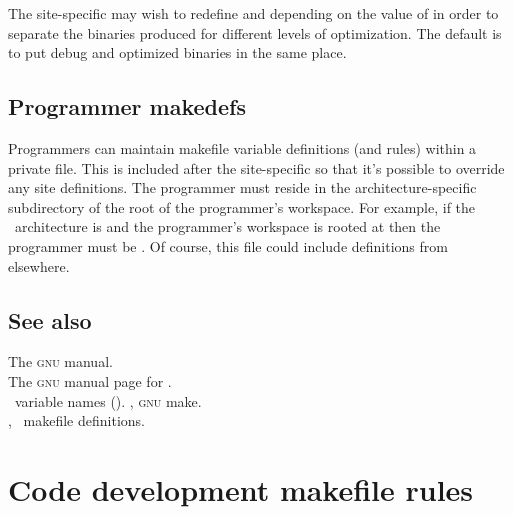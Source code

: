 The site-specific  may wish to redefine  and
 depending on the value of  in order to separate the
binaries produced for different levels of optimization.  The default is to put
debug and optimized binaries in the same place.

\subsection*{Programmer makedefs}

Programmers can maintain makefile variable definitions (and rules) within a
private  file.  This is included after the site-specific
 so that it's possible to override any site definitions.  The
programmer  must reside in the architecture-specific
subdirectory of the root of the programmer's workspace.  For example, if the
\aipspp\ architecture is  and the programmer's workspace is
rooted at  then the programmer  must be
.  Of course, this file could
include  definitions from elsewhere.

\subsection*{See also}
 
The \textsc{gnu}  manual.\\
The \textsc{gnu} manual page for .\\
\aipspp\ variable names ().
, \textsc{gnu} make.\\
, \aipspp\ makefile definitions.
 

\newpage
\section{Code development makefile rules}
\label{Code development makefile rules}

